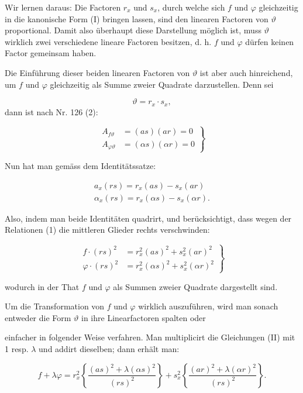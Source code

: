 \documentclass[11pt]{article}
\providecommand{\weberpage}[1]{}
\providecommand{\weq}[2]{\begin{equation}\tag{#1}#2\end{equation}}
\begin{document}
Wir lernen daraus: Die Factoren $r_x$ und $s_x$, durch welche sich $f$ und $\varphi$
gleichzeitig in die kanonische Form (I) bringen lassen, sind den linearen Factoren
von $\vartheta$ proportional. Damit also überhaupt diese Darstellung möglich ist,
muss $\vartheta$ wirklich zwei verschiedene lineare Factoren besitzen, d. h. $f$ und
$\varphi$ dürfen keinen Factor gemeinsam haben.

Die Einführung dieser beiden linearen Factoren von $\vartheta$ ist aber auch
hinreichend, um $f$ und $\varphi$ gleichzeitig als Summe zweier Quadrate darzustellen.
Denn sei

\[
\vartheta = r_x \cdot s_x,
\]
dann ist nach Nr. 126 (2):

\weq{1}{\left.\begin{aligned} A_{f\vartheta} &= (as)(ar) = 0\\ A_{\varphi\vartheta} &= (\alpha s)(\alpha r) = 0\end{aligned}\right\}}

Nun hat man gemäss dem Identitätssatze:

\[
\begin{gathered}
a_x(rs) = r_x(as) - s_x(ar)\\
\alpha_x(rs) = r_x(\alpha s) - s_x(\alpha r).
\end{gathered}
\]

Also, indem man beide Identitäten quadrirt, und berücksichtigt, dass wegen der
Relationen (1) die mittleren Glieder rechts verschwinden:

\weq{II}{\left.\begin{aligned} f\cdot(rs)^2 &= r_x^2(as)^2 + s_x^2(ar)^2\\ \varphi\cdot(rs)^2 &= r_x^2(\alpha s)^2 + s_x^2(\alpha r)^2\end{aligned}\right\}}

wodurch in der That $f$ und $\varphi$ als Summen zweier Quadrate dargestellt sind.

Um die Transformation von $f$ und $\varphi$ wirklich auszuführen, wird man sonach
entweder die Form $\vartheta$ in ihre Linearfactoren spalten oder


\weberpage{147}
einfacher in folgender Weise verfahren. Man multiplicirt die Gleichungen (II) mit
1 resp. $\lambda$ und addirt dieselben; dann erhält man:

\[
f + \lambda\varphi = r_x^2\left\{\frac{(as)^2+\lambda(\alpha s)^2}{(rs)^2}\right\} + s_x^2\left\{\frac{(ar)^2+\lambda(\alpha r)^2}{(rs)^2}\right\}.
\]
\end{document}
